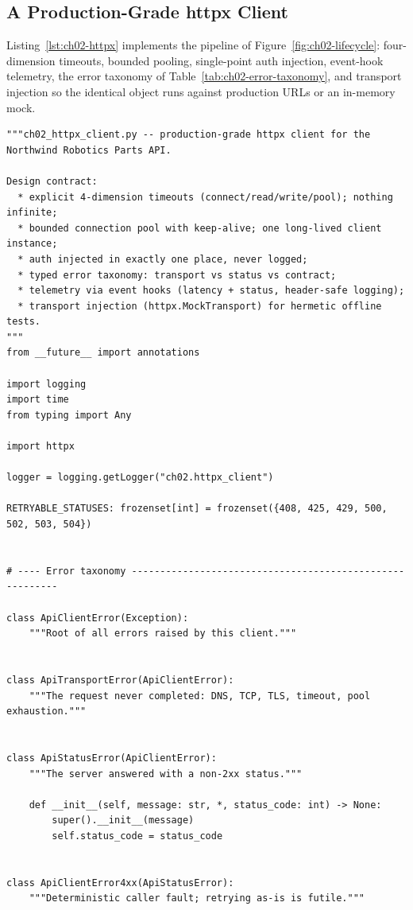 \subsection{A Production-Grade httpx Client}
\label{sec:ch02-httpxclient}

Listing~\ref{lst:ch02-httpx} implements the pipeline of
Figure~\ref{fig:ch02-lifecycle}: four-dimension timeouts, bounded pooling,
single-point auth injection, event-hook telemetry, the error taxonomy of
Table~\ref{tab:ch02-error-taxonomy}, and transport injection so the identical
object runs against production URLs or an in-memory mock.

\begin{verbatim}
"""ch02_httpx_client.py -- production-grade httpx client for the
Northwind Robotics Parts API.

Design contract:
  * explicit 4-dimension timeouts (connect/read/write/pool); nothing infinite;
  * bounded connection pool with keep-alive; one long-lived client instance;
  * auth injected in exactly one place, never logged;
  * typed error taxonomy: transport vs status vs contract;
  * telemetry via event hooks (latency + status, header-safe logging);
  * transport injection (httpx.MockTransport) for hermetic offline tests.
"""
from __future__ import annotations

import logging
import time
from typing import Any

import httpx

logger = logging.getLogger("ch02.httpx_client")

RETRYABLE_STATUSES: frozenset[int] = frozenset({408, 425, 429, 500, 502, 503, 504})


# ---- Error taxonomy ---------------------------------------------------------

class ApiClientError(Exception):
    """Root of all errors raised by this client."""


class ApiTransportError(ApiClientError):
    """The request never completed: DNS, TCP, TLS, timeout, pool exhaustion."""


class ApiStatusError(ApiClientError):
    """The server answered with a non-2xx status."""

    def __init__(self, message: str, *, status_code: int) -> None:
        super().__init__(message)
        self.status_code = status_code


class ApiClientError4xx(ApiStatusError):
    """Deterministic caller fault; retrying as-is is futile."""



\end{verbatim}
